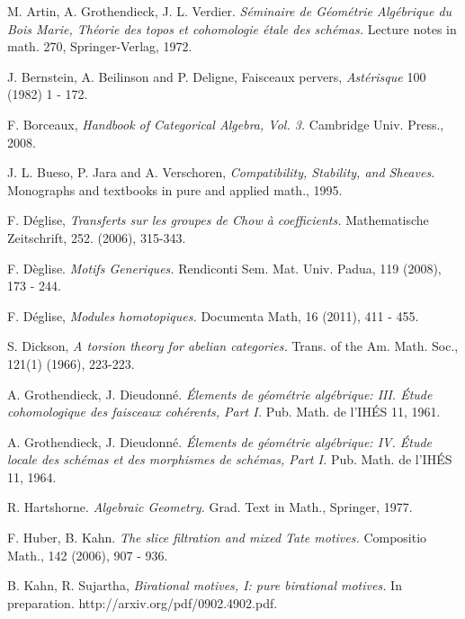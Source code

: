 \newpage

\begin{thebibliography}{10}

M. Artin, A. Grothendieck, J. L. Verdier.
{\em S\'eminaire de G\'eom\'etrie Alg\'ebrique du Bois Marie,
Th\'eorie des topos et cohomologie \'etale des sch\'emas.}
Lecture notes in math. 270, Springer-Verlag, 1972.

J. Bernstein, A. Beilinson and P. Deligne,
Faisceaux pervers, {\em Ast\'erisque} 100 (1982) 1 - 172.

F. Borceaux,
{\em Handbook of Categorical Algebra, Vol. 3.}
Cambridge Univ. Press., 2008.

J. L. Bueso, P. Jara and A. Verschoren,
{\em Compatibility, Stability, and Sheaves.}
Monographs and textbooks in pure and applied math.,
1995.

F. D\'eglise,
\emph{Transferts sur les groupes de Chow \`a coefficients.}
Mathematische Zeitschrift, 252. (2006), 315-343.

F. D\`eglise.
\emph{Motifs Generiques.}
Rendiconti Sem. Mat. Univ. Padua, 119 (2008), 173 - 244.

F. D\'eglise, 
\emph{Modules homotopiques.}
Documenta Math,
16 (2011), 411 - 455.

S. Dickson,
\emph{A torsion theory for abelian categories.}
Trans. of the Am. Math. Soc., 121(1) (1966), 223-223.

A. Grothendieck, J. Dieudonn\'e.
{\em \'Elements de g\'eom\'etrie alg\'ebrique: III. \'Etude 
cohomologique des faisceaux coh\'erents, Part I.} 
Pub. Math. de l'IH\'ES 11, 1961.

A. Grothendieck, J. Dieudonn\'e.
\emph{\'Elements de g\'eom\'etrie alg\'ebrique: IV. \'Etude locale 
des sch\'emas et des morphismes de sch\'emas, Part I.}
Pub. Math. de l'IH\'ES 11, 1964.

R. Hartshorne.
\emph{Algebraic Geometry.}
Grad. Text in Math.,
Springer, 1977.

F. Huber, B. Kahn.
\emph{The slice filtration and mixed Tate motives.}
Compositio Math., 142 (2006), 907 - 936.

B. Kahn, R. Sujartha,
\emph{Birational motives, I: pure birational motives.}
In preparation.
http://arxiv.org/pdf/0902.4902.pdf.


\end{thebibliography}
